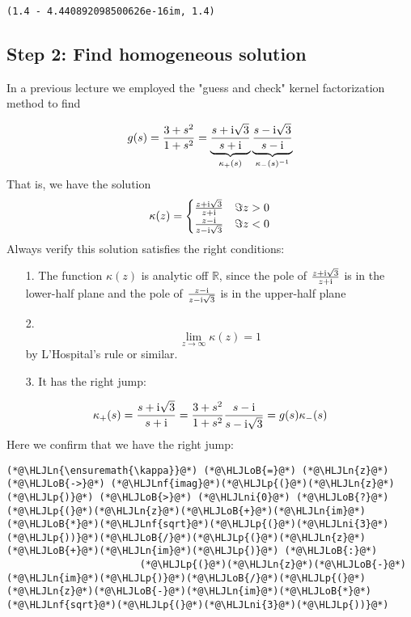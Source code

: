 \documentclass[12pt,landscape]{article}
\newcommand{\HLJLn}[1]{#1}
\newcommand{\HLJLnf}[1]{\textcolor[RGB]{66,102,213}{#1}}
\newcommand{\HLJLni}[1]{\textcolor[RGB]{59,151,46}{#1}}
\newcommand{\HLJLoB}[1]{\textcolor[RGB]{102,102,102}{\textbf{#1}}}
\newcommand{\HLJLp}[1]{#1}
\def\I{ {\rm i} }
\def\R{ {\mathbb R} }
\begin{document}
{\begin{lstlisting}
(1.4 - 4.440892098500626e-16im, 1.4)
\end{lstlisting}


\subsection{Step 2: Find homogeneous solution}
In a previous lecture we employed the "guess and check" kernel factorization method to find

\[
g(s) = {3 + s^2 \over 1 + s^2} = \underbrace{s + \I \sqrt{3} \over s + \I}_{\kappa_+(s)}
\underbrace{s - \I \sqrt{3} \over s-\I }_{\kappa_-(s)^{-1}}
\]
That is, we have the solution
\[
\kappa(z) = \begin{cases} {z + \I \sqrt{3} \over z + \I}  & \Im z > 0 \\
                            {z - \I  \over z - \I \sqrt{3}} & \Im z < 0
                            \end{cases}
\]
Always verify this solution satisfies the right conditions:

\begin{itemize}
\item[1. ] The function $\kappa(z)$ is analytic off $\R$, since the pole of ${z + \I \sqrt{3} \over z + \I}$ is in the lower-half plane and the pole of ${z - \I  \over z - \I \sqrt{3}}$ is in the upper-half plane


\item[2. ] \[
\lim_{z \to \infty} \kappa(z) = 1
\]
by L'Hospital's rule or similar.


\item[3. ] It has the right jump:

\end{itemize}
\[
\kappa_+(s) = {s + \I \sqrt{3} \over s + \I} = {3 + s^2 \over 1 + s^2}{s - \I  \over s - \I \sqrt{3}} = g(s)\kappa_-(s)
\]
Here we confirm that we have the right jump:


\begin{lstlisting}
(*@\HLJLn{\ensuremath{\kappa}}@*) (*@\HLJLoB{=}@*) (*@\HLJLn{z}@*) (*@\HLJLoB{->}@*) (*@\HLJLnf{imag}@*)(*@\HLJLp{(}@*)(*@\HLJLn{z}@*)(*@\HLJLp{)}@*) (*@\HLJLoB{>}@*) (*@\HLJLni{0}@*) (*@\HLJLoB{?}@*) (*@\HLJLp{(}@*)(*@\HLJLn{z}@*)(*@\HLJLoB{+}@*)(*@\HLJLn{im}@*)(*@\HLJLoB{*}@*)(*@\HLJLnf{sqrt}@*)(*@\HLJLp{(}@*)(*@\HLJLni{3}@*)(*@\HLJLp{))}@*)(*@\HLJLoB{/}@*)(*@\HLJLp{(}@*)(*@\HLJLn{z}@*)(*@\HLJLoB{+}@*)(*@\HLJLn{im}@*)(*@\HLJLp{)}@*) (*@\HLJLoB{:}@*)
                       (*@\HLJLp{(}@*)(*@\HLJLn{z}@*)(*@\HLJLoB{-}@*)(*@\HLJLn{im}@*)(*@\HLJLp{)}@*)(*@\HLJLoB{/}@*)(*@\HLJLp{(}@*)(*@\HLJLn{z}@*)(*@\HLJLoB{-}@*)(*@\HLJLn{im}@*)(*@\HLJLoB{*}@*)(*@\HLJLnf{sqrt}@*)(*@\HLJLp{(}@*)(*@\HLJLni{3}@*)(*@\HLJLp{))}@*)


\end{lstlisting}}
\end{document}

